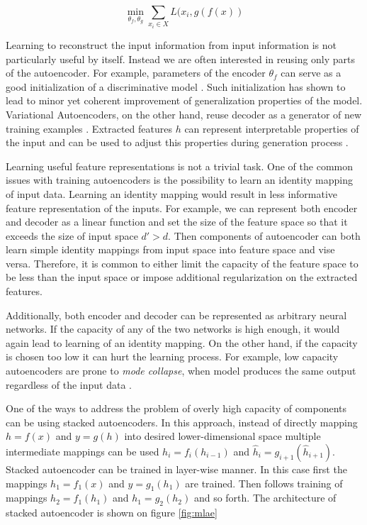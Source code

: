 \begin{equation}\label{eq:ae}
\min_{\theta_f, \theta_g}\sum\limits_{x_i \in X}{L(x_i, g(f(x))}
\end{equation}

Learning to reconstruct the input information from input information is not particularly useful by itself.
Instead we are often interested in reusing only parts of the autoencoder.
For example, parameters of the encoder $\theta_f$ can serve as a good initialization of a discriminative model \cite{Masci2011, Vincent2010, Zhao2015}.
Such initialization has shown to lead to minor yet coherent improvement of generalization properties of the model.
Variational Autoencoders, on the other hand, reuse decoder as a generator of new training examples \cite{Kingma2013}.
Extracted features $h$ can represent interpretable properties of the input and can be used to adjust this
properties during generation process \cite{Kulkarni2015, Whitney2016}.

Learning useful feature representations is not a trivial task.
One of the common issues with training autoencoders is the possibility to learn an identity mapping of input data.
Learning an identity mapping would result in less informative feature representation of the inputs.
For example, we can represent both encoder and decoder as a linear function and set the size of the feature space so that it exceeds the size of input space $d' > d$.
Then components of autoencoder can both learn simple identity mappings from input space into feature space and vise versa.
Therefore, it is common to either limit the capacity of the feature space to be less than the input space or impose additional regularization on the extracted features.

Additionally, both encoder and decoder can be represented as arbitrary neural networks.
If the capacity of any of the two networks is high enough, it would again lead to learning of an identity mapping.
On the other hand, if the capacity is chosen too low it can hurt the learning process.
For example, low capacity autoencoders are prone to \textit{mode collapse}, when model produces the same output regardless of the input data \cite{Radford2015}.

One of the ways to address the problem of overly high capacity of components can be using stacked autoencoders.
In this approach, instead of directly mapping $h=f(x)$ and $y=g(h)$ into desired lower-dimensional space multiple intermediate mappings can be used $h_i=f_i(h_{i-1})$ and $\hat{h}_i=g_{i+1}(\hat{h}_{i+1})$.
Stacked autoencoder can be trained in layer-wise manner.
In this case first the mappings $h_1=f_1(x)$  and $y=g_1(h_1)$ are trained.
Then follows training of mappings $h_2=f_1(h_1)$ and $h_1=g_2(h_2)$ and so forth.
The architecture of stacked autoencoder is shown on figure \ref{fig:mlae}

